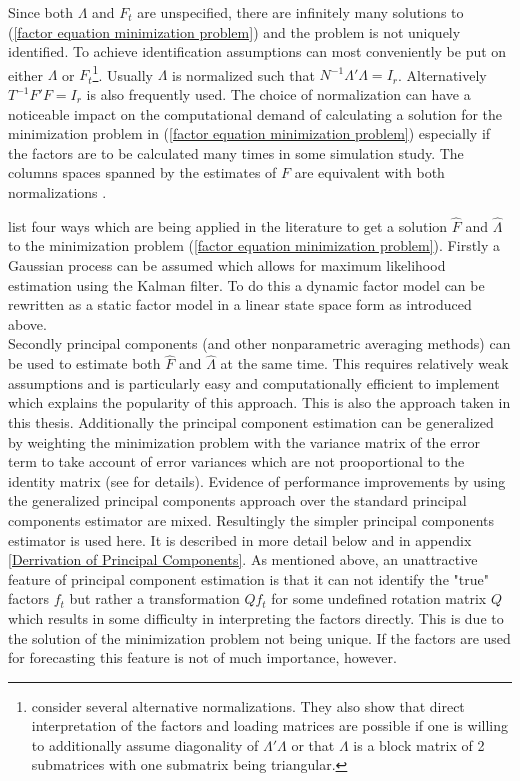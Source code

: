 \documentclass[12pt]{article}
\begin{document}
Since both $\Lambda$ and $F_t$ are unspecified, there are infinitely many solutions to (\ref{factor equation minimization problem}) and the problem is not uniquely identified. To achieve identification assumptions can most conveniently be put on either $\Lambda$ or $F_t$\footnote{\citet{bai2013principal} consider several alternative normalizations. They also show that direct interpretation of the factors and loading matrices are possible if one is willing to additionally assume diagonality of $\Lambda'\Lambda$ or that $\Lambda$ is a block matrix of 2 submatrices with one submatrix being triangular.}. Usually $\Lambda$ is normalized such that $N^{-1} \Lambda'\Lambda = I_r$. Alternatively $T^{-1}F'F = I_r$ is also frequently used. The choice of normalization can have a noticeable impact on the computational demand of calculating a solution for the minimization problem in (\ref{factor equation minimization problem}) especially if the factors are to be calculated many times in some simulation study. The columns spaces spanned by the estimates of $F$ are equivalent with both normalizations \citep{stock2011dynamic}.

\citet{stock2011dynamic} list four ways which are being applied in the literature to get a solution $\hat F$ and $\hat \Lambda$ to the minimization problem (\ref{factor equation minimization problem}). Firstly a Gaussian process can be assumed which allows for maximum likelihood estimation using the Kalman filter. To do this a dynamic factor model can be rewritten as a static factor model in a linear state space form as introduced above. \\
Secondly principal components (and other nonparametric averaging methods) can be used to estimate both $\hat F$ and $\hat \Lambda$ at the same time. This requires relatively weak assumptions and is particularly easy and computationally efficient to implement which explains the popularity of this approach. This is also the approach taken in this thesis. Additionally the principal component estimation can be generalized by weighting the minimization problem with the variance matrix of the error term to take account of error variances which are not prooportional to the identity matrix (see \citet{stock2011dynamic} for details). Evidence of performance improvements by using the generalized principal components approach over the standard principal components estimator are mixed. Resultingly the simpler principal components estimator is used here. It is described in more detail below and in appendix \ref{Derrivation of Principal Components}. As mentioned above, an unattractive feature of principal component estimation is that it can not identify the "true" factors $f_t$ but rather a transformation $Q f_t$ for some undefined rotation matrix $Q$ which results in some difficulty in interpreting the factors directly. This is due to the solution of the minimization problem not being unique. If the factors are used for forecasting this feature is not of much importance, however.
\end{document}
